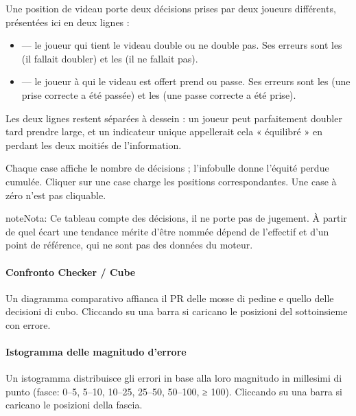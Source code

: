 \documentclass[letterpaper,10pt,italian]{sphinxmanual}
\begin{document}
\sphinxAtStartPar
Une position de videau porte deux décisions prises par deux joueurs
différents, présentées ici en deux lignes :
\begin{itemize}
\item {} 
\sphinxAtStartPar
{} — le joueur qui tient le videau double ou ne double pas. Ses
erreurs sont les  (il fallait doubler) et les  (il ne fallait pas).

\item {} 
\sphinxAtStartPar
{} — le joueur à qui le videau est offert prend ou passe. Ses
erreurs sont les  (une prise correcte a été passée) et les
 (une passe correcte a été prise).

\end{itemize}

\sphinxAtStartPar
Les deux lignes restent séparées à dessein : un joueur peut parfaitement
doubler tard  prendre large, et un indicateur unique appellerait cela
« équilibré » en perdant les deux moitiés de l’information.

\sphinxAtStartPar
Chaque case affiche le nombre de décisions ; l’infobulle donne l’équité perdue
cumulée. Cliquer sur une case charge les positions correspondantes. Une case à
zéro n’est pas cliquable.

\begin{sphinxadmonition}{note}{Nota:}
\sphinxAtStartPar
Ce tableau compte des décisions, il ne porte pas de jugement. À partir de
quel écart une tendance mérite d’être nommée dépend de l’effectif et d’un
point de référence, qui ne sont pas des données du moteur.
\end{sphinxadmonition}


\paragraph{Confronto Checker / Cube}
\label{\detokenize{manuel:repartition-checker-cube}}
\sphinxAtStartPar
Un diagramma comparativo affianca il PR delle mosse di pedine e quello delle decisioni di cubo. Cliccando su una barra si caricano le posizioni del sottoinsieme con errore.


\paragraph{Istogramma delle magnitudo d’errore}
\label{\detokenize{manuel:histogramme-des-magnitudes-d-erreur}}
\sphinxAtStartPar
Un istogramma distribuisce gli errori in base alla loro magnitudo in millesimi di punto (fasce: 0–5, 5–10, 10–25, 25–50, 50–100, ≥ 100). Cliccando su una barra si caricano le posizioni della fascia.
\end{document}

